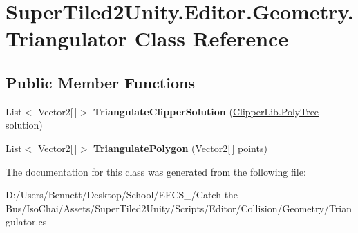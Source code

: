 \hypertarget{class_super_tiled2_unity_1_1_editor_1_1_geometry_1_1_triangulator}{}\section{Super\+Tiled2\+Unity.\+Editor.\+Geometry.\+Triangulator Class Reference}
\label{class_super_tiled2_unity_1_1_editor_1_1_geometry_1_1_triangulator}
\subsection*{Public Member Functions}
\begin{DoxyCompactItemize}
\item 
\mbox{\label{class_super_tiled2_unity_1_1_editor_1_1_geometry_1_1_triangulator_aebc6aaf31e55884eda4b955bf69786eb}} 
List$<$ Vector2\mbox{[}$\,$\mbox{]}$>$ {\bfseries Triangulate\+Clipper\+Solution} (\mbox{\hyperlink{class_super_tiled2_unity_1_1_editor_1_1_clipper_lib_1_1_poly_tree}{Clipper\+Lib.\+Poly\+Tree}} solution)
\item 
\mbox{\label{class_super_tiled2_unity_1_1_editor_1_1_geometry_1_1_triangulator_a402612ef527f4313ae8a163c390ca05a}} 
List$<$ Vector2\mbox{[}$\,$\mbox{]}$>$ {\bfseries Triangulate\+Polygon} (Vector2\mbox{[}$\,$\mbox{]} points)
\end{DoxyCompactItemize}


The documentation for this class was generated from the following file\+:\begin{DoxyCompactItemize}
\item 
D\+:/\+Users/\+Bennett/\+Desktop/\+School/\+E\+E\+C\+S\+\_/\+Catch-\/the-\/\+Bus/\+Iso\+Chai/\+Assets/\+Super\+Tiled2\+Unity/\+Scripts/\+Editor/\+Collision/\+Geometry/Triangulator.\+cs\end{DoxyCompactItemize}
